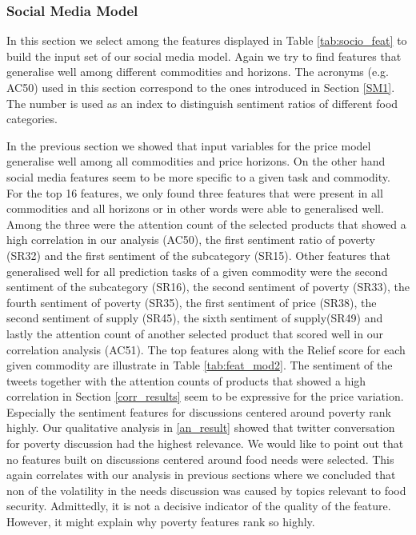 \subsubsection{Social Media Model}

In this section we select among the features displayed in Table \ref{tab:socio_feat} to build the input set of our social media model. Again we try to find features that generalise well among different commodities and horizons. The acronyms (e.g. AC50) used in this section correspond to the ones introduced in Section \ref{SM1}. The number is used as an index to distinguish sentiment ratios of different food categories. 

In the previous section we showed that input variables for the price model generalise well among all commodities and price horizons. On the other hand social media features seem to be more specific to a given task and commodity. For the top 16 features, we only found three features that were present in all commodities and all horizons or in other words were able to generalised well. Among the three were the attention count of the selected products that showed a high correlation in our analysis (AC50),  the first sentiment ratio of poverty (SR32) and the first sentiment of the subcategory (SR15). Other features that generalised well for all prediction tasks of a given commodity were the second sentiment of the subcategory (SR16),  the second sentiment of poverty (SR33), the fourth sentiment of poverty (SR35), the first sentiment of price (SR38), the second sentiment of supply (SR45), the sixth sentiment of supply(SR49) and lastly the attention count of another selected product that scored well in our correlation analysis (AC51). The top features along with the Relief score for each given commodity are illustrate in Table \ref{tab:feat_mod2}. 
The sentiment of the tweets together with the attention counts of products that showed a high correlation in Section \ref{corr_results} seem to be expressive for the price variation. Especially the sentiment features for discussions centered around poverty rank highly. Our qualitative analysis in \ref{an_result} showed that twitter conversation for poverty discussion had the highest relevance. We would like to point out that no features built on discussions centered around food needs were selected. This again correlates with our analysis in previous sections where we concluded that non of the volatility in the needs discussion was caused by topics relevant to food security.  Admittedly, it is not a decisive indicator of the quality of the feature. However, it might explain why poverty features rank so highly. 


